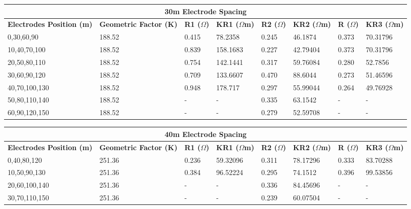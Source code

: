 \documentclass[12pt,a4paper]{report}
\begin{document}
\begin{itemize}
\begin{table}[H]
    \centering
    \begin{adjustbox}{max width=\textwidth}
    \setlength{\tabcolsep}{15pt}
    \renewcommand{\arraystretch}{1.5}
    \begin{tabular}{|p{3.5cm}|p{2.5cm}|p{1.8cm}|p{2.2cm}|p{1.8cm}|p{2.2cm}|p{1.8cm}|p{2.2cm}|}
    \hline
    \multicolumn{8}{|c|}{\rule{0pt}{3em}\huge\textbf{30m Electrode Spacing}} \\ [0.5cm]
    \hline
    \textbf{Electrodes Position (m)} & \textbf{Geometric Factor (K)} & \textbf{R1 ($\Omega$)} & \textbf{KR1 ($\Omega$m)} & \textbf{R2 ($\Omega$)} & \textbf{KR2 ($\Omega$m)} & \textbf{R ($\Omega$)} & \textbf{KR3 ($\Omega$m)} \\ \hline
    0,30,60,90 & 188.52 & 0.415 & 78.2358 & 0.245 & 46.1874 & 0.373 & 70.31796 \\ \hline
    10,40,70,100 & 188.52 & 0.839 & 158.1683 & 0.227 & 42.79404 & 0.373 & 70.31796 \\ \hline
    20,50,80,110 & 188.52 & 0.754 & 142.1441 & 0.317 & 59.76084 & 0.280 & 52.7856 \\ \hline
    30,60,90,120 & 188.52 & 0.709 & 133.6607 & 0.470 & 88.6044 & 0.273 & 51.46596 \\ \hline
    40,70,100,130 & 188.52 & 0.948 & 178.717 & 0.297 & 55.99044 & 0.264 & 49.76928 \\ \hline
    50,80,110,140 & 188.52 & - & - & 0.335 & 63.1542 & - & - \\ \hline
    60,90,120,150 & 188.52 & - & - & 0.279 & 52.59708 & - & - \\ \hline
    \end{tabular}
\end{adjustbox}
\end{table}

\begin{table}[H]
    \centering
    \begin{adjustbox}{max width=\textwidth}
    \setlength{\tabcolsep}{15pt}
    \renewcommand{\arraystretch}{1.5}
    \begin{tabular}{|p{3.5cm}|p{2.5cm}|p{1.8cm}|p{2.2cm}|p{1.8cm}|p{2.2cm}|p{1.8cm}|p{2.2cm}|}
    \hline
    \multicolumn{8}{|c|}{\rule{0pt}{3em}\huge\textbf{40m Electrode Spacing}} \\ [0.5cm]
    \hline
    \textbf{Electrodes Position (m)} & \textbf{Geometric Factor (K)} & \textbf{R1 ($\Omega$)} & \textbf{KR1 ($\Omega$m)} & \textbf{R2 ($\Omega$)} & \textbf{KR2 ($\Omega$m)} & \textbf{R ($\Omega$)} & \textbf{KR3 ($\Omega$m)} \\ \hline
    0,40,80,120 & 251.36 & 0.236 & 59.32096 & 0.311 & 78.17296 & 0.333 & 83.70288 \\ \hline
10,50,90,130 & 251.36 & 0.384 & 96.52224 & 0.295 & 74.1512 & 0.396 & 99.53856 \\ \hline
20,60,100,140 & 251.36 & - & - & 0.336 & 84.45696 & - & - \\ \hline
30,70,110,150 & 251.36 & - & - & 0.239 & 60.07504 & - & - \\ \hline
    \end{tabular}
\end{adjustbox}
\end{table}


\end{itemize}
\end{document}
